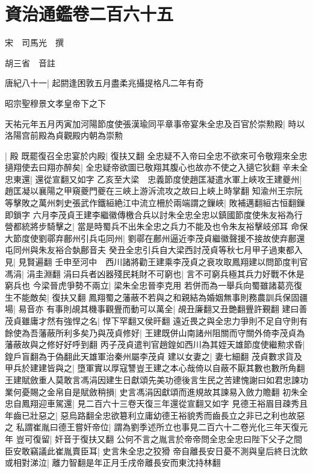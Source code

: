 \section{資治通鑑卷二百六十五}
宋　司馬光　撰

胡三省　音註

唐紀八十一|{
	起閼逢困敦五月盡柔兆攝提格凡二年有奇}


昭宗聖穆景文孝皇帝下之下

天祐元年五月丙寅加河陽節度使張漢瑜同平章事帝宴朱全忠及百官於崇勲殿|{
	時以洛陽宫前殿為貞觀殿内朝為崇勲}


|{
	殿}
既罷復召全忠宴於内殿|{
	復扶又翻}
全忠疑不入帝曰全忠不欲來可令敬翔來全忠擿翔使去曰翔亦醉矣|{
	全忠疑帝欲圖已敬翔其腹心也故亦不使之入擿它狄翻}
辛未全忠東還|{
	還從宣翻又如字}
乙亥至大梁　忠義節度使趙匡凝遣水軍上峽攻王建夔州|{
	趙匡凝以襄陽之甲窺夔門夔在三峽上游泝流攻之故曰上峽上時掌翻}
知渝州王宗阮等擊敗之萬州刺史張武作鐵絙絶江中流立柵於兩端謂之鏁峽|{
	敗補邁翻絙古恒翻鏁即鎖字}
六月李茂貞王建李繼徽傳檄合兵以討朱全忠全忠以鎮國節度使朱友裕為行營都統將步騎擊之|{
	當是時蜀兵不出朱全忠之兵力不能及也令朱友裕擊岐邠耳}
命保大節度使劉鄩弃鄜州引兵屯同州|{
	劉鄩在鄜州逼近李茂貞繼徽聲援不接故使弃鄜還屯同州與朱友裕合埶鄜音夫}
癸丑全忠引兵自大梁西討茂貞等秋七月甲子過東都入見|{
	見賢遍翻}
壬申至河中　西川諸將勸王建乘李茂貞之衰攻取鳳翔建以問節度判官馮涓|{
	涓圭淵翻}
涓曰兵者凶器殘民耗財不可窮也|{
	言不可窮兵極其兵力好戰不休是窮兵也}
今梁晉虎爭勢不兩立|{
	梁朱全忠晉李克用}
若併而為一舉兵向蜀雖諸葛亮復生不能敵矣|{
	復扶又翻}
鳳翔蜀之藩蔽不若與之和親結為婚姻無事則務農訓兵保固疆場|{
	易音亦}
有事則覘其機事觀舋而動可以萬全|{
	覘丑廉翻又丑艷翻舋許覲翻}
建曰善茂貞雖庸才然有強悍之名|{
	悍下罕翻又侯旰翻}
遠近畏之與全忠力爭則不足自守則有餘使為吾藩蔽所利多矣乃與茂貞修好|{
	王建既併山南諸州阻關而守關外倚李茂貞為藩蔽故與之修好好呼到翻}
丙子茂貞遣判官趙鍠如西川為其姪天雄節度使繼勲求昏|{
	鍠戶盲翻為于偽翻此天雄軍治秦州屬李茂貞}
建以女妻之|{
	妻七細翻}
茂貞數求貨及甲兵於建建皆與之|{
	墮軍實以厚寇讐豈王建之本心哉倚以自蔽不厭其數也數所角翻}
王建賦斂重人莫敢言馮涓因建生日獻頌先美功德後言生民之苦建愧謝曰如君忠諫功業何憂賜之金帛自是賦斂稍損|{
	史言馮涓因獻頌而進規故其諫易入斂力贍翻}
初朱全忠自鳳翔迎車駕還|{
	見二百六十三卷天復三年還從宣翻又如字}
見德王裕眉目疎秀且年齒已壯惡之|{
	惡烏路翻全忠欲簒利立庸幼德王裕貌秀而齒長立之非已之利也故惡之}
私謂崔胤曰德王嘗奸帝位|{
	謂為劉季述所立也事見二百六十二卷光化三年天復元年}
豈可復留|{
	奸音于復扶又翻}
公何不言之胤言於帝帝問全忠全忠曰陛下父子之間臣安敢竊議此崔胤賣臣耳|{
	史言朱全忠之狡猾}
帝自離長安日憂不測與皇后終日沈飲或相對涕泣|{
	離力智翻是年正月壬戌帝離長安而東沈持林翻}
